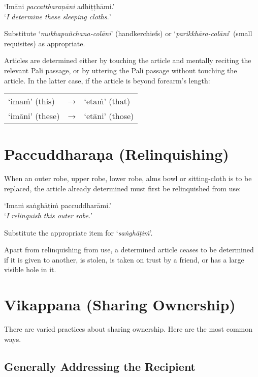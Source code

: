 ‘Imāni \emph{paccattharaṇāni} adhiṭṭhāmi.’\\
‘\emph{I determine these sleeping cloths.}’

Substitute ‘\emph{mukhapuñchana-colāni}’ (handkerchiefs) or
‘\emph{parikkhāra-colāni}’ (small requisites) as appropriate.

Articles are determined either by touching the article and mentally reciting the
relevant Pali passage, or by uttering the Pali passage without touching the
article. In the latter case, if the article is beyond forearm's length:

\ifhandbookedition
\enlargethispage{\baselineskip}
\fi

\begin{tabular}{@{}lll@{}}
‘imaṁ’ (this) & → & ‘etaṁ’ (that)\\
‘imāni’ (these) & → & ‘etāni’ (those)\\
\end{tabular}


\section{Paccuddharaṇa (Relinquishing)}
\label{relinquish-robe}

When an outer robe, upper robe, lower robe, alms bowl or sitting-cloth is to be
replaced, the article already determined must first be relinquished from use:

‘Imaṁ saṅghāṭiṁ paccuddharāmi.’\\
‘\emph{I relinquish this outer robe.}’ 

Substitute the appropriate item for ‘\emph{saṅghāṭiṁ}’.

Apart from relinquishing from use, a determined article ceases to be determined
if it is given to another, is stolen, is taken on trust by a friend, or has a
large visible hole in it.

\section{Vikappana (Sharing Ownership)}

There are varied practices about sharing ownership. Here are the most common
ways.

\subsection{Generally Addressing the Recipient}
\label{general-address}

